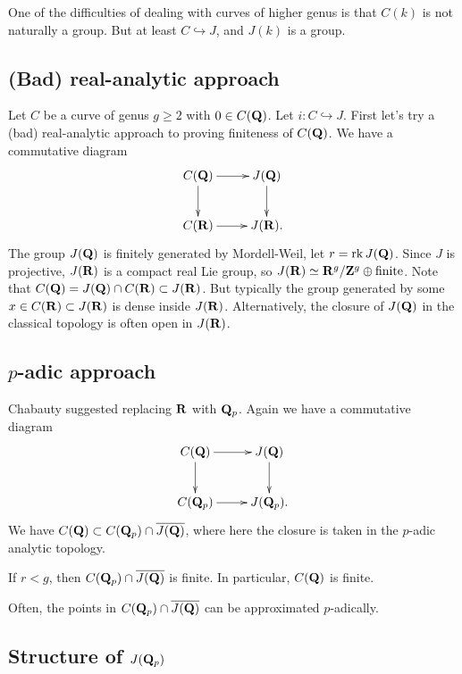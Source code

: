 One of the difficulties of dealing with curves of higher genus is that $C(k)$ 
is not naturally a group. But at least $C\hookrightarrow J$, and $J(k)$ is a 
group. 





\subsection{(Bad) real-analytic approach}

Let $C$ be a curve of genus $g\geqslant 2$ with $0\in C(\mathbf{Q})$. Let 
$i:C\hookrightarrow J$. First let's try a (bad) real-analytic approach 
to proving finiteness of $C(\mathbf{Q})$. We have a commutative diagram 
\[\xymatrix{
  C(\dQ) \ar[r] \ar[d] 
    & J(\dQ) \ar[d] \\
  C(\dR) \ar[r] 
    & J(\dR) .
}\]
The group $J(\mathbf{Q})$ is finitely generated by Mordell-Weil, let $r=\operatorname{rk} J(\mathbf{Q})$. 
Since $J$ is projective, $J(\mathbf{R})$ is a compact real Lie group, so 
$J(\mathbf{R}) \simeq \mathbf{R}^g/\mathbf{Z}^g\oplus \text{finite}$. Note that 
$C(\mathbf{Q})=J(\mathbf{Q})\cap C(\mathbf{R})\subset J(\mathbf{R})$. But typically the group generated by 
some $x\in C(\mathbf{R})\subset J(\mathbf{R})$ is dense inside $J(\mathbf{R})$. Alternatively, the 
closure of $J(\mathbf{Q})$ in the classical topology is often open in $J(\mathbf{R})$. 





\subsection{\texorpdfstring{$p$}{p}-adic approach}

Chabauty suggested replacing $\mathbf{R}$ with $\mathbf{Q}_p$. Again we have a commutative 
diagram 
\[\xymatrix{
  C(\dQ) \ar[r] \ar[d] 
    & J(\dQ) \ar[d] \\
  C(\dQ_p) \ar[r] 
    & J(\dQ_p) .
}\]
We have $C(\mathbf{Q})\subset C(\mathbf{Q}_p)\cap \overline{J(\mathbf{Q})}$, where here the closure 
is taken in the $p$-adic analytic topology. 

\begin{theo}[Chabauty 1941]
If $r<g$, then $C(\mathbf{Q}_p)\cap \overline{J(\mathbf{Q})}$ is finite. In particular, 
$C(\mathbf{Q})$ is finite. 
\end{theo}

Often, the points in $C(\mathbf{Q}_p)\cap \overline{J(\mathbf{Q})}$ can be approximated 
$p$-adically. 





\subsection{Structure of \texorpdfstring{$J(\mathbf{Q}_p)$}{J(Qp)}}

